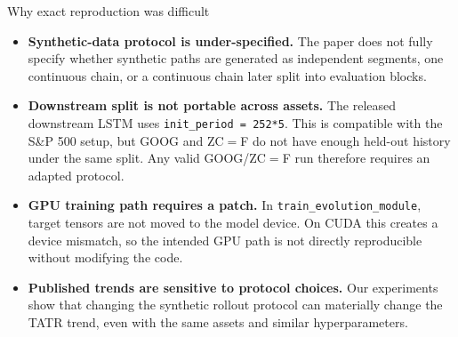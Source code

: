 \begin{frame}{Why exact reproduction was difficult}
\begin{itemize}\setlength\itemsep{5pt}
  \item \textbf{Synthetic-data protocol is under-specified.}
        The paper does not fully specify whether synthetic paths are generated as
        independent segments, one continuous chain, or a continuous chain later split
        into evaluation blocks.

  \item \textbf{Downstream split is not portable across assets.}
        The released downstream LSTM uses \texttt{init\_period = 252*5}.
        This is compatible with the S\&P 500 setup, but GOOG and ZC$=$F do not
        have enough held-out history under the same split. Any valid GOOG/ZC$=$F
        run therefore requires an adapted protocol.

  \item \textbf{GPU training path requires a patch.}
        In \texttt{train\_evolution\_module}, target tensors are not moved to the
        model device. On CUDA this creates a device mismatch, so the intended GPU
        path is not directly reproducible without modifying the code.

  \item \textbf{Published trends are sensitive to protocol choices.}
        Our experiments show that changing the synthetic rollout protocol can
        materially change the TATR trend, even with the same assets and similar
        hyperparameters.
\end{itemize}

\end{frame}


